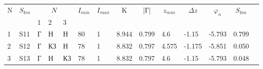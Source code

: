 
	\begin{tabular}{|l|l|l|l|l|l|l|l|l|l|l|l|l|l}
	\cline{1-13}
	\multicolumn{1}{|c|}{\multirow{2}{*}{N}} & \multicolumn{1}{c|}{\multirow{2}{*}{$S_{km}$}} & \multicolumn{3}{c|}{$N_{}$} & \multicolumn{1}{c|}{\multirow{2}{*}{$I_{min}$}} & \multicolumn{1}{c|}{\multirow{2}{*}{$I_{max}$}} & \multicolumn{1}{c|}{\multirow{2}{*}{K}} & \multicolumn{1}{c|}{\multirow{2}{*}{|Г|}} & \multicolumn{1}{c|}{\multirow{2}{*}{$z_{min}$}} & \multicolumn{1}{c|}{\multirow{2}{*}{$\Delta z$}} & \multicolumn{1}{c|}{\multirow{2}{*}{$\varphi_n$}} & \multicolumn{1}{c|}{\multirow{2}{*}{$S_{km}$}} &  \\ \cline{3-5}
	\multicolumn{1}{|c|}{}                   & \multicolumn{1}{c|}{}                          & 1      & 2       & 3      & \multicolumn{1}{c|}{}                           & \multicolumn{1}{c|}{}                           & \multicolumn{1}{c|}{}                   & \multicolumn{1}{c|}{}                     & \multicolumn{1}{c|}{}                           & \multicolumn{1}{c|}{}                            & \multicolumn{1}{c|}{}                             & \multicolumn{1}{c|}{}                          &  \\ \cline{1-13}
	1                                        & S11                                            & Г      & Н       & Н      & 80                                              & 1                                               & 8.944                                   & 0.799                                     & 4.6                                             & -1.15                                            & -5.793                                            & 0.799                                          &  \\ \cline{1-13}
	2                                        & S12                                            & Г      & КЗ      & Н      & 78                                              & 1                                               & 8.832                                   & 0.797                                     & 4.575                                           & -1.175                                           & -5.851                                            & 0.050                                          &  \\ \cline{1-13}
	3                                        & S13                                            & Г      & Н       & КЗ     & 78                                              & 1                                               & 8.832                                   & 0.797                                     & 4.6                                             & -1.15                                            & -5.793                                            & 0.048                                          &  \\ \cline{1-13}

\end{tabular}
